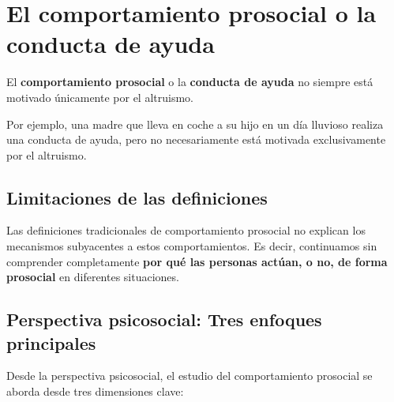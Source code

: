 \documentclass[
]{book}
\begin{document}
\chapter{El comportamiento prosocial o la conducta de ayuda}\label{el-comportamiento-prosocial-o-la-conducta-de-ayuda}

El \textbf{comportamiento prosocial} o la \textbf{conducta de ayuda} no siempre está motivado únicamente por el altruismo.

Por ejemplo, una madre que lleva en coche a su hijo en un día lluvioso realiza una conducta de ayuda, pero no necesariamente está motivada exclusivamente por el altruismo.

\section{Limitaciones de las definiciones}\label{limitaciones-de-las-definiciones}

Las definiciones tradicionales de comportamiento prosocial no explican los mecanismos subyacentes a estos comportamientos. Es decir, continuamos sin comprender completamente \textbf{por qué las personas actúan, o no, de forma prosocial} en diferentes situaciones.

\section{Perspectiva psicosocial: Tres enfoques principales}\label{perspectiva-psicosocial-tres-enfoques-principales}

Desde la perspectiva psicosocial, el estudio del comportamiento prosocial se aborda desde tres dimensiones clave:
\end{document}
